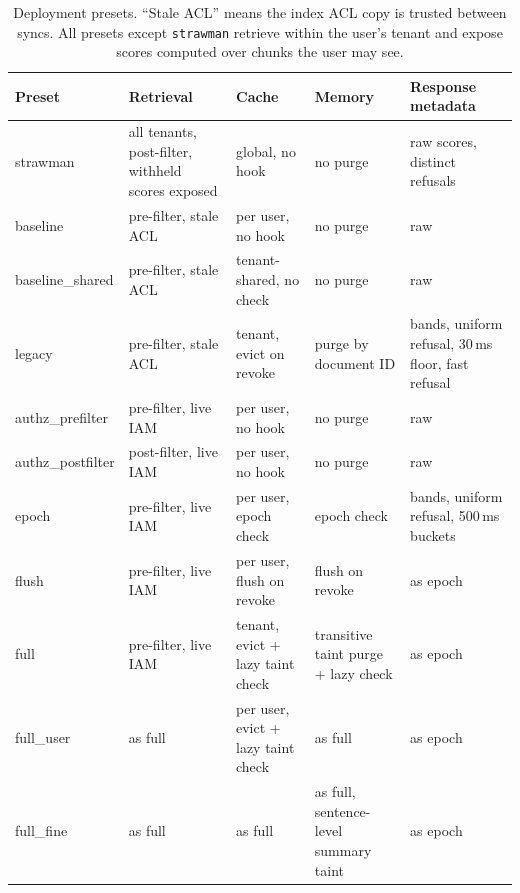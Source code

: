 \begin{table}[t]
\centering
\caption{Deployment presets. ``Stale ACL'' means the index ACL copy is trusted between syncs. All
presets except \texttt{strawman} retrieve within the user's tenant and expose scores computed over
chunks the user may see.}
\label{tab:presets}
\footnotesize
\begin{tabular}{@{}p{2.2cm}p{3.1cm}p{3.6cm}p{3.6cm}p{3.6cm}@{}}
\toprule
Preset & Retrieval & Cache & Memory & Response metadata \\
\midrule
strawman & all tenants, post-filter, withheld scores exposed & global, no hook & no purge & raw scores, distinct refusals \\
baseline & pre-filter, stale ACL & per user, no hook & no purge & raw \\
baseline\_shared & pre-filter, stale ACL & tenant-shared, no check & no purge & raw \\
legacy & pre-filter, stale ACL & tenant, evict on revoke & purge by document ID & bands, uniform refusal, 30\,ms floor, fast refusal \\
authz\_prefilter & pre-filter, live IAM & per user, no hook & no purge & raw \\
authz\_postfilter & post-filter, live IAM & per user, no hook & no purge & raw \\
epoch & pre-filter, live IAM & per user, epoch check & epoch check & bands, uniform refusal, 500\,ms buckets \\
flush & pre-filter, live IAM & per user, flush on revoke & flush on revoke & as epoch \\
full & pre-filter, live IAM & tenant, evict + lazy taint check & transitive taint purge + lazy check & as epoch \\
full\_user & as full & per user, evict + lazy taint check & as full & as epoch \\
full\_fine & as full & as full & as full, sentence-level summary taint & as epoch \\
\bottomrule
\end{tabular}
\end{table}
